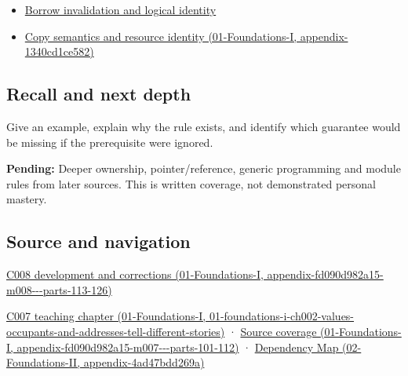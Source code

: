 \begin{itemize}
\tightlist
\item
  \hyperref[appendix-f9b8b9188c7f]{Borrow invalidation and logical identity}
\item
  \href{../01-Foundations-I/main.pdf\#nameddest=appendix-1340cd1ce582}{Copy semantics and resource identity (01-Foundations-I, appendix-1340cd1ce582)}
\end{itemize}

\subsection{Recall and next depth}\label{appendix-f1581457d322-recall-and-next-depth}

Give an example, explain why the rule exists, and identify which guarantee would be missing if the prerequisite were ignored.

\textbf{Pending:} Deeper ownership, pointer/reference, generic programming and module rules from later sources. This is written coverage, not demonstrated personal mastery.

\subsection{Source and navigation}\label{appendix-f1581457d322-source-and-navigation}

\href{../01-Foundations-I/main.pdf\#nameddest=appendix-fd090d982a15-m008---parts-113-126}{C008 development and corrections (01-Foundations-I, appendix-fd090d982a15-m008-\/-\/-parts-113-126)}

\href{../01-Foundations-I/main.pdf\#nameddest=01-foundations-i-ch002-values-occupants-and-addresses-tell-different-stories}{C007 teaching chapter (01-Foundations-I, 01-foundations-i-ch002-values-occupants-and-addresses-tell-different-stories)} · \href{../01-Foundations-I/main.pdf\#nameddest=appendix-fd090d982a15-m007---parts-101-112}{Source coverage (01-Foundations-I, appendix-fd090d982a15-m007-\/-\/-parts-101-112)} · \href{../02-Foundations-II/main.pdf\#nameddest=appendix-4ad47bdd269a}{Dependency Map (02-Foundations-II, appendix-4ad47bdd269a)}
